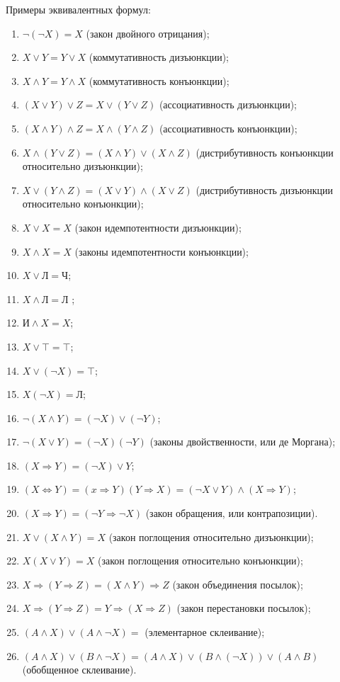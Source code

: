 \documentclass[a4paper, 12pt]{report}
\begin{document}
Примеры эквивалентных формул:\\
\begin{enumerate}
	\item $ \neg (\neg X) = X$ (закон двойного отрицания);
	\item $X\vee Y=Y\vee X$ (коммутативность дизъюнкции);
	\item $X\wedge Y = Y\wedge X$ (коммутативность конъюнкции);
	\item $(X\vee Y)\vee Z= X\vee(Y\vee Z)$ (ассоциативность дизъюнкции);
	\item $(X\wedge Y) \wedge Z= X\wedge (Y\wedge Z)$ (ассоциативность конъюнкции);
	\item $X\wedge (Y\vee Z)=(X \wedge Y)\vee(X\wedge Z)$ (дистрибутивность конъюнкции относительно дизъюнкции);
	\item $X\vee(Y\wedge Z)=(X\vee Y)\wedge (X\vee Z)$ (дистрибутивность дизъюнкции относительно конъюнкции);
	\item $X\vee X= X$ (закон идемпотентности дизъюнкции);
	\item $X\wedge X = X$ (законы идемпотентности конъюнкции);
	\item $X\vee \text{Л} = Ч$;
	\item $X \wedge \text{Л} = \text{Л }$;
	\item $\text{И} \wedge X=X$;
	
	
		\item $X\vee \top = \top$;
		\item $X\vee(\neg X)=\top$;
		\item $X (\neg X)=\text{Л}$;
		\item $\neg(X\wedge Y)=(\neg X)\vee(\neg Y)$;
		\item $\neg(X\vee Y)=(\neg X) (\neg Y)$ (законы двойственности, или де Моргана);
		\item $(X\Rightarrow Y)= (\neg X)\vee Y$;
		\item $(X\Leftrightarrow Y)=(x\Rightarrow Y) (Y\Rightarrow X)= (\neg X \vee Y) \wedge (X\Rightarrow Y)$;
		\item $(X\Rightarrow Y)= (\neg Y\Rightarrow \neg X)$ (закон обращения, или контрапозиции).
		\item $X\vee (X\wedge Y)= X$ (закон поглощения относительно дизъюнкции);
		\item $X (X\vee Y) = X$ (закон поглощения относительно конъюнкции);
		\item $X\Rightarrow (Y \Rightarrow Z) = (X\wedge Y) \Rightarrow Z$ (закон объединения посылок);
		\item $X\Rightarrow (Y \Rightarrow Z) = Y \Rightarrow (X\Rightarrow Z)$ (закон перестановки посылок);
		\item $(A \wedge X)\vee (A \wedge \neg X)= $ (элементарное склеивание);
		\item $(A \wedge X)\vee (B \wedge \neg X)=(A \wedge X)\vee (B \wedge (\neg X))\vee (A \wedge B)$ (обобщенное склеивание).
	
	
	
\end{enumerate}
\end{document}
